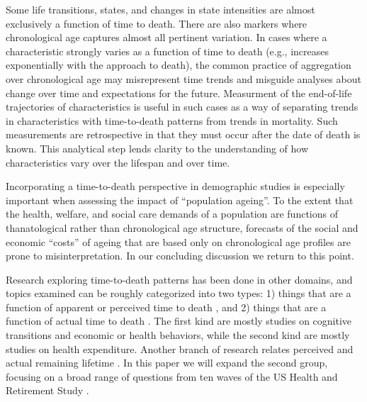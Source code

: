 \documentclass{article}
\begin{document}
Some life
transitions, states, and changes in state intensities are almost exclusively a
function of time to death. There are also markers where chronological age
captures almost all pertinent variation. In cases where a characteristic strongly varies as a
function of time to death (e.g., increases exponentially with the approach to death),
the common practice of aggregation over chronological age may misrepresent time
trends and misguide analyses about change over time and expectations for the
future.  Measurment of the
end-of-life trajectories of characteristics is useful in such cases as a way of separating
trends in characteristics with time-to-death patterns from trends in mortality.
Such measurements are retrospective in that they must occur after the date
of death is known. This analytical step lends clarity to the understanding of
how characteristics vary over the lifespan and over time.

Incorporating a time-to-death perspective in demographic studies is especially
important when assessing the impact of ``population ageing''.
To the extent that the health, welfare, and social care demands of a
population are functions of thanatological rather than chronological age
structure, forecasts of the social and economic ``costs'' of ageing that are
based only on chronological age profiles are prone to misinterpretation.
In our concluding discussion we return to this point.

Research exploring time-to-death patterns has been done in other
domains, and topics examined can be roughly categorized into two types: 1) things that are a
function of apparent or perceived time to death
\citep{hamermesh1985expectations,hurd1995evaluation,carstensen2006influence,gan2004subjective,biro2010subjective,salm2010subjective,van2010living,cocco2012longevity,payne2013life,balia2013survival},
and 2) things that are a function of actual time to death
\citep{miller2001increasing,seshamani2004longitudinal,werblow2007population}.
The first kind are mostly studies on cognitive transitions and economic or
health behaviors, while the second kind are mostly studies on health
expenditure.
Another branch of research relates perceived and actual remaining lifetime
\citep{perozek2008using,delavande2011differential,post2012longevity,kutlu2013individuals}.
In this paper we will expand the second group, focusing on a broad range of
questions from ten waves of the US Health and Retirement Study \citep{HRS}.
\end{document}
